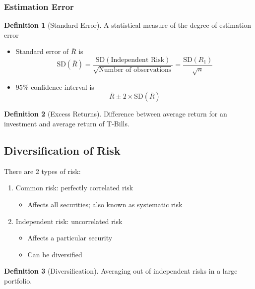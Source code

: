 \documentclass[11pt]{article}
\theoremstyle{definition}
\newtheorem*{definition}{Definition}
\newcommand{\Sd}{\text{SD}}
\begin{document}
\subsubsection{Estimation Error}
\begin{definition}[Standard Error]
    A statistical measure of the degree of estimation error
    \begin{itemize}
        \item Standard error of $\bar R$ is 
        \begin{equation*}
            \Sd(\bar R) = \frac{\Sd(\text{Independent Risk})}{\sqrt{\text{Number of observations}}} = \frac{\Sd(R_1)}{\sqrt{n}}
        \end{equation*}
        \item $95\%$ confidence interval is 
        \begin{equation*}
            \bar R \pm 2 \times \Sd(\bar R)
        \end{equation*}
    \end{itemize}
\end{definition}
\begin{definition}[Excess Returns]
    Difference between average return for an investment and average return of T-Bills.
\end{definition}

\subsection{Diversification of Risk}
There are 2 types of risk:
\begin{enumerate}
    \item Common risk: perfectly correlated risk
    \begin{itemize}
        \item Affects all securities; also known as systematic risk
    \end{itemize}
    \item Independent risk: uncorrelated risk
    \begin{itemize}
        \item Affects a particular security
        \item Can be diversified
    \end{itemize}
\end{enumerate}
\begin{definition}[Diversification]
    Averaging out of independent risks in a large portfolio.
\end{definition}
\end{document}
